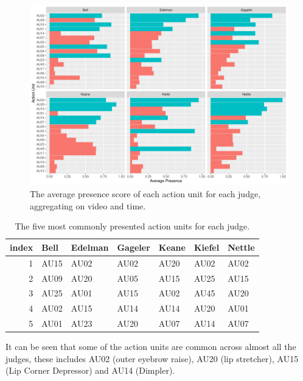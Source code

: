 \documentclass{monashthesis}
\begin{document}
\begin{figure}

{\centering \includegraphics[width=1\linewidth]{figures/most-common-1} 

}

\caption{The average presence score of each action unit for each judge, aggregating on video and time. \label{fig:mean_presence}}\label{fig:most-common}
\end{figure}

\begin{table}[ht]
\begin{center}
\caption{\label{tab:most_common}The five most commonly presented action units for each judge.}
\begin{tabular}{rllllll}
\toprule
index & Bell & Edelman & Gageler & Keane & Kiefel & Nettle \\
\midrule
1 & AU15 & AU02 & AU02 & AU20 & AU02 & AU02 \\
2 & AU09 & AU20 & AU05 & AU15 & AU25 & AU15 \\
3 & AU25 & AU01 & AU15 & AU02 & AU45 & AU20 \\
4 & AU02 & AU15 & AU14 & AU14 & AU20 & AU01 \\
5 & AU01 & AU23 & AU20 & AU07 & AU14 & AU07 \\
\bottomrule
\end{tabular}
\end{center}
\end{table}

It can be seen that some of the action units are common across almost all the judges, these includes AU02 (outer eyebrow raise), AU20 (lip stretcher), AU15 (Lip Corner Depressor) and AU14 (Dimpler).
\end{document}
